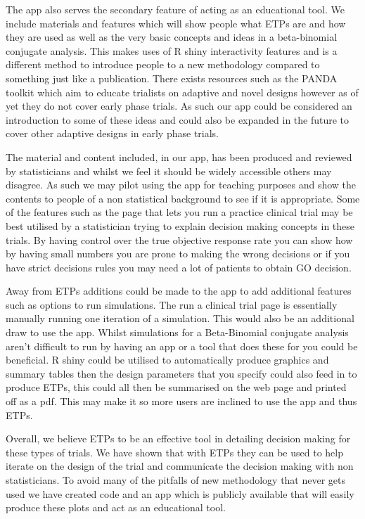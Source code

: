 The app also serves the secondary feature of acting as an educational tool. We include materials and features which will show people what ETPs are and how they are used as well as the very basic concepts and ideas in a beta-binomial conjugate analysis. This makes uses of R shiny interactivity features and is a different method to introduce people to a new methodology compared to something just like a publication. There exists resources such as the PANDA toolkit \cite{dimairoPANDAPracticalAdaptive2022} which aim to educate trialists on adaptive and novel designs however as of yet they do not cover early phase trials. As such our app could be considered an introduction to some of these ideas and could also be expanded in the future to cover other adaptive designs in early phase trials.   

The material and content included, in our app, has been produced and reviewed by statisticians and whilst we feel it should be widely accessible others may disagree. As such we may pilot using the app for teaching purposes and show the contents to people of a non statistical background to see if it is appropriate. Some of the features such as the page that lets you run a practice clinical trial may be best utilised by a statistician trying to explain decision making concepts in these trials. By having control over the true objective response rate you can show how by having small numbers you are prone to making the wrong decisions or if you have strict decisions rules you may need a lot of patients to obtain GO decision. 

Away from ETPs additions could be made to the app to add additional features such as options to run simulations. The run a clinical trial page is essentially manually running one iteration of a simulation. This would also be an additional draw to use the app. Whilst simulations for a Beta-Binomial conjugate analysis aren't difficult to run by having an app or a tool that does these for you could be beneficial. R shiny could be utilised to automatically produce graphics and summary tables then the design parameters that you specify could also feed in to produce ETPs, this could all then be summarised on the web page and printed off as a pdf. This may make it so more users are inclined to use the app and thus ETPs. 

Overall, we believe ETPs to be an effective tool in detailing decision making for these types of trials. We have shown that with ETPs they can be used to help iterate on the design of the trial and communicate the decision making with non statisticians. To avoid many of the pitfalls of new methodology that never gets used we have created code and an app which is publicly available that will easily produce these plots and act as an educational tool. 